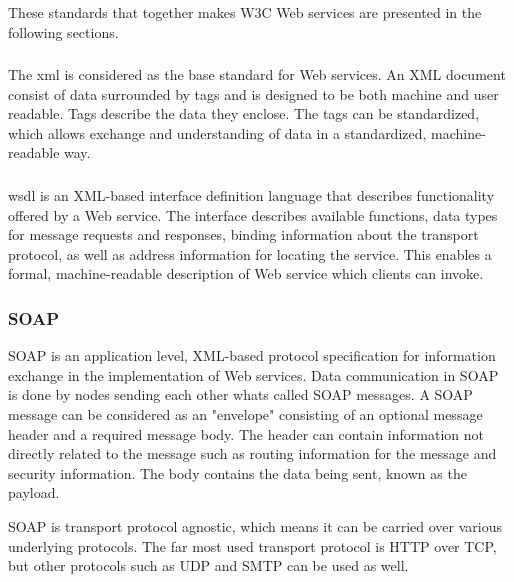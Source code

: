 These standards that together makes W3C Web services are presented in the
following sections.

\subsubsection{}

The \gls{xml}\cite{W3C-XML} is considered as the base standard for Web services.
An XML document consist of data surrounded by tags and is designed to be both
machine and user readable. Tags describe the data they enclose. The tags can be
standardized, which allows exchange and understanding of data in a standardized,
machine-readable way.


\subsubsection{}

\gls{wsdl} is an XML-based interface definition language that describes
functionality offered by a Web service\cite{w3c-wsdl}. The interface describes
available functions, data types for message requests and responses, binding
information about the transport protocol, as well as address information for
locating the service. This enables a formal, machine-readable description of Web
service which clients can invoke.

\subsubsection{SOAP}

SOAP is an application level, XML-based protocol specification for information
exchange\cite{w3c-soap} in the implementation of Web services. Data
communication in SOAP is done by nodes sending each other whats called SOAP
messages. A SOAP message can be considered as an "envelope" consisting of an
optional message header and a required message body. The header can contain
information not directly related to the message such as routing information for
the message and security information. The body contains the data being sent,
known as the payload.

SOAP is transport protocol agnostic, which means it can be carried over various
underlying protocols. The far most used transport protocol is HTTP over TCP, but
other protocols such as UDP and SMTP can be used as well.

\subsection{}
\label{rest}

